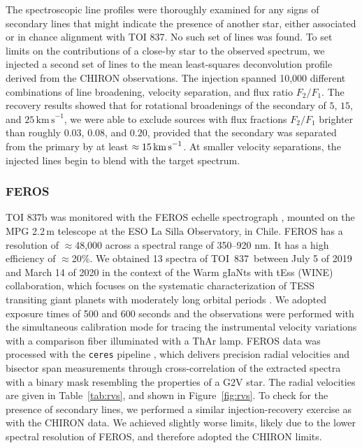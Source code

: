 \documentclass[12pt,twocolumn,tighten]{aastex63}
\newcommand{\tn}{TOI~837} %
\begin{document}
The spectroscopic line profiles were thoroughly examined for any signs
of secondary lines that might indicate the presence of another star,
either associated or in chance alignment with TOI 837. No such set of
lines was found. To set limits on the contributions of a close-by
star to the observed spectrum, we injected a second set of lines to
the mean least-squares deconvolution profile derived from the CHIRON
observations. The injection spanned 10,000 different combinations of
line broadening, velocity separation, and flux ratio $F_2/F_1$. The
recovery results showed that for rotational broadenings of the
secondary of $5$, $15$, and $25\,\mathrm{km\,s}^{-1}$, we were able to
exclude sources with flux fractions $F_2/F_1$ brighter than roughly
$0.03$, $0.08$, and $0.20$, provided that the secondary was separated
from the primary by at least $\approx 15\,{\rm km\,s}^{-1}$.  At
smaller velocity separations, the injected lines begin to blend with
the target spectrum.


\subsubsection{FEROS}
TOI 837b was monitored with the FEROS echelle spectrograph
\citep{kaufer_commissioning_1999}, mounted on the MPG 2.2$\,$m
telescope at the ESO La Silla Observatory, in Chile. FEROS has a
resolution of $\approx$48,000 across a spectral range of 350–920 nm.
It has a high efficiency of $\approx$20\%. We obtained 13
spectra of \tn\ between July 5 of 2019 and March 14 of 2020 in the
context of the Warm gIaNts with tEss (WINE) collaboration, which
focuses on the systematic characterization of TESS transiting giant
planets with moderately long orbital periods \citep[{\it
e.g.},][]{brahm:2019,jordan:2020}.  We adopted exposure times of 500
and 600 seconds and the observations were performed with the
simultaneous calibration mode for tracing the instrumental velocity
variations with a comparison fiber illuminated with a ThAr lamp. FEROS
data was processed with the \texttt{ceres} pipeline
\citep{brahm_2017_ceres}, which delivers precision radial velocities
and bisector span measurements through cross-correlation of the
extracted spectra with a binary mask resembling the properties of a
G2V star. The radial velocities are given in Table~\ref{tab:rvs}, and
shown in Figure~\ref{fig:rvs}.  To check for the presence of secondary
lines, we performed a similar injection-recovery exercise as with the
CHIRON data.  We achieved slightly worse limits, likely due to the
lower spectral resolution of FEROS, and therefore adopted the CHIRON
limits.
\end{document}
